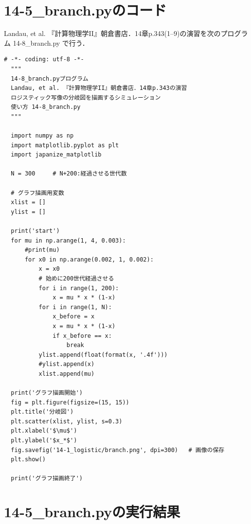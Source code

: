 \documentclass[a4paper, oneside]{jsarticle}
\begin{document}
\newpage
\section{14-5\_branch.pyのコード}

Landau, et al. 『計算物理学II』朝倉書店．14章p.343(1--9)の演習を次のプログラム 14-8\_branch.py で行う．

\begin{lstlisting}[caption=14-8\_branch.py, label=branch]
  # -*- coding: utf-8 -*-
  """
  14-8_branch.pyプログラム
  Landau, et al. 『計算物理学II』朝倉書店．14章p.343の演習
  ロジスティック写像の分岐図を描画するシミュレーション
  使い方 14-8_branch.py
  """

  import numpy as np 
  import matplotlib.pyplot as plt 
  import japanize_matplotlib
  
  N = 300     # N+200:経過させる世代数
  
  # グラフ描画用変数
  xlist = []
  ylist = []
  
  print('start')
  for mu in np.arange(1, 4, 0.003):
      #print(mu)
      for x0 in np.arange(0.002, 1, 0.002):
          x = x0
          # 始めに200世代経過させる
          for i in range(1, 200):
              x = mu * x * (1-x)
          for i in range(1, N):
              x_before = x
              x = mu * x * (1-x)
              if x_before == x:
                  break
          ylist.append(float(format(x, '.4f')))
          #ylist.append(x)
          xlist.append(mu)
  
  print('グラフ描画開始')
  fig = plt.figure(figsize=(15, 15))
  plt.title('分岐図')
  plt.scatter(xlist, ylist, s=0.3)
  plt.xlabel('$\mu$')
  plt.ylabel('$x_*$')
  fig.savefig('14-1_logistic/branch.png', dpi=300)   # 画像の保存
  plt.show()
  
  print('グラフ描画終了')  
\end{lstlisting}

\newpage
\section{14-5\_branch.pyの実行結果}
\end{document}
